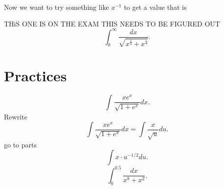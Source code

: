 \documentclass[a4paper]{article}
\begin{document}
Now we want to try something like $x^{-1}$ to get a value that is 

THiS ONE IS ON THE EXAM THIS NEEDS TO BE FIGURED OUT 
\[
\int_{0}^{\infty} \frac{dx}{\sqrt{x^{\frac{1}{3}}+x^3}}
.\] 

\section{Practices}%
\label{sec:Practices}
\[
\int_{}^{} \frac{xe^{x}}{\sqrt{1+e^{x}}}dx
.\] 
Rewrite 
\[
\int \frac{xe^{x}}{\sqrt{1+e^{x}}} dx = \int \frac{x}{\sqrt{u}} du
.\] 
go to parts
\[
\int x \cdot u^{-1/2} du
.\] 
\[
\int_{0}^{0.5} \frac{dx}{x^{8}+x^2}
.\] 
\end{document}
